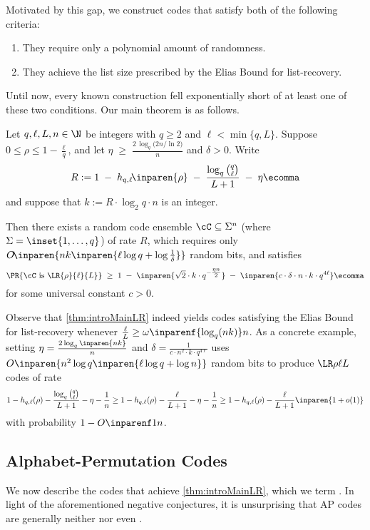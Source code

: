 \documentclass[11pt]{article}
\begin{document}
Motivated by this gap, we construct codes that satisfy both of the following criteria:
\begin{enumerate}
  \item They require only a polynomial amount of randomness.
  \item They achieve the list size prescribed by the Elias Bound for list-recovery.
\end{enumerate}
Until now, every known construction fell exponentially short of at least one of these two conditions. Our main theorem is as follows.

\begin{theorem}\label{thm:introMainLR}
Let $q,\ell,L,n \in \N$ be integers with $q \ge 2$ and $\ell < \min\{q,L\}$. Suppose $0 \le \rho \le 1 - \tfrac{\ell}{q}$, and let 
$
\eta \;\ge\; \frac{2\,\log_q\!\bigl(2n/\ln2\bigr)}{n}
$ and $\delta > 0$. Write
\[ R :=
1
\;-\;
h_{q,\ell}\!\inparen{\rho}
\;-\;
\frac{\log_q \binom q\ell}{L+1}
\;-\;
\eta
\ecomma
\]
and suppose that $k := {R\cdot \log_2 q\cdot n}$ is an integer.

Then there exists a random code ensemble $\cC \subseteq \Sigma^n$ (where $\Sigma = \inset{1,\dots,q}$) of rate $R$, which requires only $O\!\inparen{nk\inparen{\ell\log q + \log \tfrac 1\delta}}$ random bits, and satisfies
\[
\PR{\cC \text{ is } \LR{\rho}{\ell}{L}}
\;\ge\;
1 \;-\;
\inparen{\sqrt 2\cdot k \cdot q^{-\tfrac{\eta n}{2}}}
\;-\;
\inparen{c\cdot \delta \cdot n\cdot k\cdot q^{4\ell}}
\ecomma
\]
for some universal constant $c > 0$.
\end{theorem}

Observe that \cref{thm:introMainLR} indeed yields codes satisfying the Elias Bound for list-recovery whenever $\frac \ell L \ge \omega\inparenf{\log_q (nk)}n$. As a concrete example, setting $\eta = \frac{2\log_q\inparen{nk}}{n}$ and $\delta =\frac {1}{c\cdot n^2\cdot k\cdot q^{4\ell}}$ uses $O\inparen{n^2\log q\inparen{\ell\log q  + \log n}}$ random bits to produce $\LR \rho \ell L$ codes of rate
$$
1 - h_{q,\ell}(\rho) -\frac{\log_q \binom q\ell}{L+1}
 - \eta - \frac 1 n \ge 1 - h_{q,\ell}(\rho) - \frac{\ell}{L+1} - \eta - \frac 1n \ge 1 - h_{q,\ell}(\rho) - \frac{\ell}{L+1}\inparen{1+o(1)}
$$
with probability $1-O\inparenf 1n$.

\subsection{Alphabet-Permutation Codes}
We now describe the codes that achieve \cref{thm:introMainLR}, which we term . In light of the aforementioned negative conjectures, it is unsurprising that AP codes are generally neither  nor even .
\end{document}
